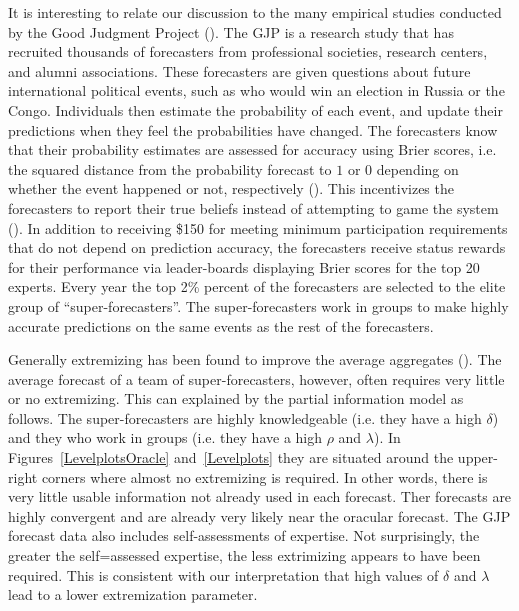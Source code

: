 \documentclass[11pt]{article}
\theoremstyle{definition}
\theoremstyle{definition}
\begin{document}
It is interesting to relate our discussion to the many empirical 
studies conducted by the Good Judgment Project %
(\citealt{mellers2014psychological, ungar2012good}).  The GJP is 
a research study that has recruited thousands of forecasters 
from professional societies, research centers, and alumni associations. 
These forecasters are given questions about future international 
political events, such as who would win an election in Russia or 
the Congo.  Individuals then estimate the probability of each event, and 
update their predictions when they feel the probabilities have changed.  
The forecasters know that their probability estimates are assessed 
for accuracy using Brier scores, i.e. the squared distance from the  
probability forecast to $1$ or $0$ depending on whether the event 
happened or not, respectively (\citealt{Brier}).  This incentivizes 
the forecasters to report their true beliefs instead of attempting 
to game the system (\citealt{winkler1968good}).  In addition to receiving 
\$150 for meeting minimum participation requirements that do not depend 
on prediction accuracy, the forecasters receive status rewards for 
their performance via leader-boards displaying Brier scores for the 
top 20 experts.  Every year the top 2\% percent of the forecasters 
are selected to the elite group of ``super-forecasters''.  The 
super-forecasters work in groups to make highly accurate predictions 
on the same events as the rest of the forecasters. 

Generally extremizing has been found to improve the average 
aggregates (\citet{mellers2014psychological}).  The average 
forecast of a team of super-forecasters, however, often 
requires very little or no extremizing.  This can explained by 
the partial information model as follows.  The super-forecasters 
are highly knowledgeable (i.e. they have a high $\delta$) 
and they who work in groups (i.e. they have a high $\rho$ and 
$\lambda$).  In Figures~\ref{LevelplotsOracle} and~\ref{Levelplots} 
they are situated around the upper-right corners where almost 
no extremizing is required.  In other words, there is very little
usable information not already used in each forecast.  Ther
forecasts are highly convergent and are already very likely near
the oracular forecast.  The GJP forecast data also includes 
self-assessments of expertise.  Not surprisingly, the greater
the self=assessed expertise, the less extrimizing appears to 
have been required.  This is consistent with our interpretation
that high values of $\delta$ and $\lambda$ lead to a lower
extremization parameter.
\end{document}

